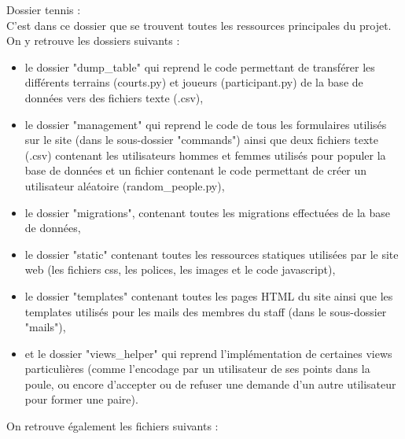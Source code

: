 Dossier tennis :\\

C'est dans ce dossier que se trouvent toutes les ressources principales du projet. On y retrouve les dossiers suivants :
\begin{itemize}
	\item le dossier "dump\_table" qui reprend le code permettant de transférer les différents terrains (courts.py) et joueurs (participant.py) de la base de données vers des fichiers texte (.csv),
	\item le dossier "management" qui reprend le code de tous les formulaires utilisés sur le site (dans le sous-dossier "commands") ainsi que deux fichiers texte (.csv) contenant les utilisateurs hommes et femmes utilisés pour populer la base de données et un fichier contenant le code permettant de créer un utilisateur aléatoire (random\_people.py),
	\item le dossier "migrations", contenant toutes les migrations effectuées de la base de données,
	\item le dossier "static" contenant toutes les ressources statiques utilisées par le site web (les fichiers css, les polices, les images et le code javascript),
	\item le dossier "templates" contenant toutes les pages HTML du site ainsi que les templates utilisés pour les mails des membres du staff (dans le sous-dossier "mails"),
	\item et le dossier "views\_helper" qui reprend l'implémentation de certaines views particulières (comme l'encodage par un utilisateur de ses points dans la poule, ou encore d'accepter ou de refuser une demande d'un autre utilisateur pour former une paire).\\
\end{itemize}

On retrouve également les fichiers suivants :\\

